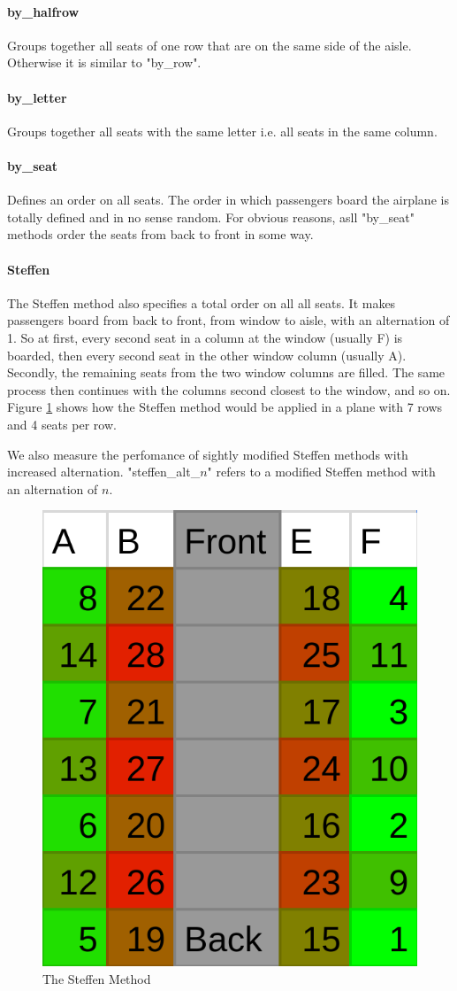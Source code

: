 \documentclass[11pt]{article}
\begin{document}
\paragraph{by\_halfrow} Groups together all seats of one row that are on the same side of the aisle. Otherwise it is similar to "by\_row".

\paragraph{by\_letter} Groups together all seats with the same letter i.e. all seats in the same column.

\paragraph{by\_seat} Defines an order on all seats. The order in which passengers board the airplane is totally defined and in no sense random. For obvious reasons, asll "by\_seat" methods order the seats from back to front in some way.

\paragraph{Steffen}
The Steffen method also specifies a total order on all all seats. It makes passengers board from back to front, from window to aisle, with an alternation of 1. So at first, every second seat in a column at the window (usually F) is boarded, then every second seat in the other window column (usually A). Secondly, the remaining seats from the two window columns are filled. The same process then continues with the columns second closest to the window, and so on. Figure \ref{fig:steffen} shows how the Steffen method would be applied in a plane with 7 rows and 4 seats per row.


We also measure the perfomance of sightly modified Steffen methods with increased alternation. "steffen\_alt\_$n$" refers to a modified Steffen method with an alternation of $n$.

\begin{figure}
	\center
	\label{fig:steffen}
	\includegraphics[width=0.3\linewidth]{images/steffen.png}
	\caption{The Steffen Method}
\end{figure}
\end{document}
